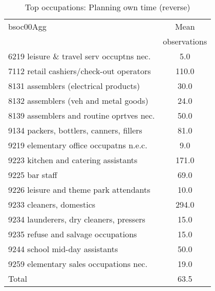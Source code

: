 \begin{table}
	\centering
	\caption{Top occupations: Planning own time (reverse)}
	\begin{tabular}{lc}
	\toprule	
		
bsoc00Agg&Mean \\
&observations \\
\hline
6219 leisure \& travel serv occuptns nec.&5.0 \\
7112 retail cashiers/check-out operators&110.0 \\
8131 assemblers (electrical products)&30.0 \\
8132 assemblers (veh and metal goods)&24.0 \\
8139 assemblers and routine oprtves nec.&50.0 \\
9134 packers, bottlers, canners, fillers&81.0 \\
9219 elementary office occupatns n.e.c.&9.0 \\
9223 kitchen and catering assistants&171.0 \\
9225 bar staff&69.0 \\
9226 leisure and theme park attendants&10.0 \\
9233 cleaners, domestics&294.0 \\
9234 launderers, dry cleaners, pressers&15.0 \\
9235 refuse and salvage occupations&15.0 \\
9244 school mid-day assistants&50.0 \\
9259 elementary sales occupations nec.&19.0 \\
Total&63.5 \\
\bottomrule
\bottomrule
\end{tabular}
\end{table}
